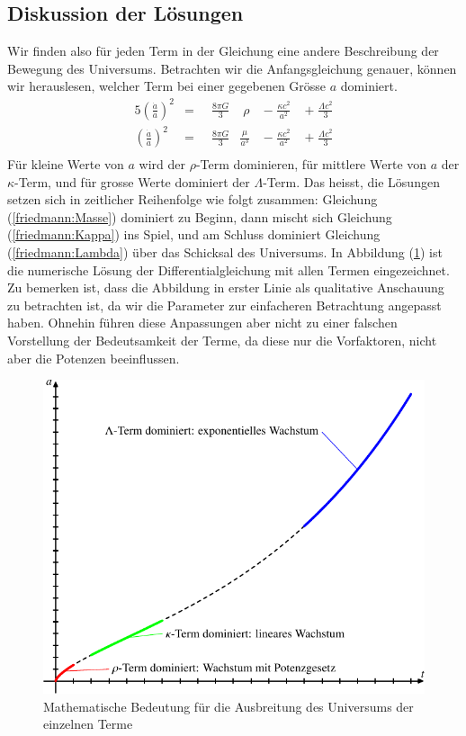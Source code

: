 \begin{refsection}
\subsection*{Diskussion der Lösungen}
Wir finden also für jeden Term in der Gleichung eine andere Beschreibung der Bewegung des Universums. Betrachten wir die Anfangsgleichung genauer, können wir herauslesen, welcher Term bei einer gegebenen Grösse $a$ dominiert.
\begin{alignat}{5}
\left(\frac{\dot{a}}{a}\right) ^2 &= \;\; &\frac{8 \pi G}{3}&\;\rho\; &-\;\frac{\kappa c^2}{a^2}\; &+ \;\frac{\Lambda c^2}{3}\\
\left(\frac{\dot{a}}{a}\right) ^2 &= \;\;&\frac{8 \pi G}{3} &\frac{\mu}{a^3}\; &-\;\frac{\kappa c^2}{a^2}\; &+\; \frac{\Lambda c^2}{3}\\
\end{alignat}
Für kleine Werte von $a$ wird der $\rho$-Term dominieren, für mittlere Werte von $a$ der $\kappa$-Term, und für grosse Werte dominiert der $\Lambda$-Term. Das heisst, die Lösungen setzen sich in zeitlicher Reihenfolge wie folgt zusammen:
Gleichung (\ref{friedmann:Masse})  dominiert zu Beginn, dann mischt sich Gleichung (\ref{friedmann:Kappa}) ins Spiel, und am Schluss dominiert Gleichung (\ref{friedmann:Lambda}) über das Schicksal des Universums. In Abbildung (\ref{friedmann:mathematischFriedmann}) ist die numerische Lösung der Differentialgleichung mit allen Termen eingezeichnet.
Zu bemerken ist, dass die Abbildung in erster Linie als qualitative Anschauung zu betrachten ist, da wir die Parameter zur einfacheren Betrachtung angepasst haben. Ohnehin führen diese Anpassungen aber nicht zu einer falschen Vorstellung der Bedeutsamkeit der Terme, da diese nur die Vorfaktoren, nicht aber die Potenzen beeinflussen. 
\begin{figure}[h]
	\centering
	\includegraphics{friedmann/images/friedmann-2.pdf}
	\caption{Mathematische Bedeutung für die Ausbreitung des Universums der einzelnen Terme}
	\label{friedmann:mathematischFriedmann}
\end{figure}%

\end{refsection}
